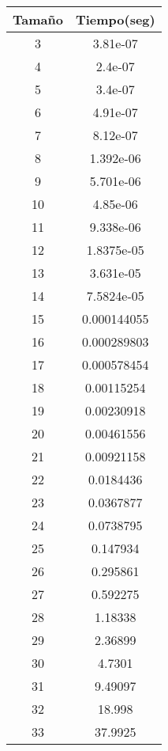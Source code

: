 \begin{longtable}{|c|c|}
\hline
\textbf{Tamaño}                   & \textbf{Tiempo(seg)} \\ \hline
3                        & 3.81e-07    \\ \hline
4                        & 2.4e-07     \\ \hline
5                        & 3.4e-07     \\ \hline
6                        & 4.91e-07    \\ \hline
7                        & 8.12e-07    \\ \hline
8                        & 1.392e-06   \\ \hline
9                        & 5.701e-06   \\ \hline
10                       & 4.85e-06    \\ \hline
11                       & 9.338e-06   \\ \hline
12                       & 1.8375e-05  \\ \hline
13                       & 3.631e-05   \\ \hline
14                       & 7.5824e-05  \\ \hline
15                       & 0.000144055 \\ \hline
16                       & 0.000289803 \\ \hline
17                       & 0.000578454 \\ \hline
18                       & 0.00115254  \\ \hline
19                       & 0.00230918  \\ \hline
20                       & 0.00461556  \\ \hline
21                       & 0.00921158  \\ \hline
22                       & 0.0184436   \\ \hline
23                       & 0.0367877   \\ \hline
24                       & 0.0738795   \\ \hline
25                       & 0.147934    \\ \hline
26                       & 0.295861    \\ \hline
27                       & 0.592275    \\ \hline
28                       & 1.18338     \\ \hline
29                       & 2.36899     \\ \hline
30                       & 4.7301      \\ \hline
31                       & 9.49097     \\ \hline
32                       & 18.998      \\ \hline
33                       & 37.9925     \\ \hline
\end{longtable}
